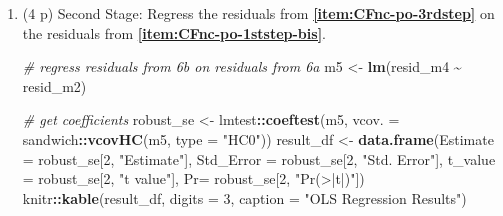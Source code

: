 \documentclass[
]{article}
\newenvironment{Shaded}{\begin{snugshade}}{\end{snugshade}}
\newcommand{\AttributeTok}[1]{\textcolor[rgb]{0.13,0.29,0.53}{#1}}
\newcommand{\CommentTok}[1]{\textcolor[rgb]{0.56,0.35,0.01}{\textit{#1}}}
\newcommand{\DecValTok}[1]{\textcolor[rgb]{0.00,0.00,0.81}{#1}}
\newcommand{\FunctionTok}[1]{\textcolor[rgb]{0.13,0.29,0.53}{\textbf{#1}}}
\newcommand{\NormalTok}[1]{#1}
\newcommand{\OtherTok}[1]{\textcolor[rgb]{0.56,0.35,0.01}{#1}}
\newcommand{\SpecialCharTok}[1]{\textcolor[rgb]{0.81,0.36,0.00}{\textbf{#1}}}
\newcommand{\StringTok}[1]{\textcolor[rgb]{0.31,0.60,0.02}{#1}}
\begin{document}
\begin{enumerate}
\begin{enumerate}
\begin{enumerate}
\begin{Shaded}
\end{Shaded}
    \item
      (4 p) Second Stage: Regress the residuals from
      \textbf{\ref{item:CFnc-po-3rdstep}} on the residuals from
      \textbf{\ref{item:CFnc-po-1ststep-bis}}.\label{item:CFnc-po-4thstep}

\begin{Shaded}
\begin{Highlighting}[]
\CommentTok{\# regress residuals from 6b on residuals from 6a}
\NormalTok{m5 }\OtherTok{\textless{}{-}} \FunctionTok{lm}\NormalTok{(resid\_m4 }\SpecialCharTok{\textasciitilde{}}\NormalTok{ resid\_m2)}

\CommentTok{\# get coefficients}
\NormalTok{robust\_se }\OtherTok{\textless{}{-}}\NormalTok{ lmtest}\SpecialCharTok{::}\FunctionTok{coeftest}\NormalTok{(m5, }\AttributeTok{vcov. =}\NormalTok{ sandwich}\SpecialCharTok{::}\FunctionTok{vcovHC}\NormalTok{(m5, }\AttributeTok{type =} \StringTok{"HC0"}\NormalTok{))}
\NormalTok{result\_df }\OtherTok{\textless{}{-}} \FunctionTok{data.frame}\NormalTok{(}\AttributeTok{Estimate =}\NormalTok{ robust\_se[}\DecValTok{2}\NormalTok{, }\StringTok{"Estimate"}\NormalTok{],}
                        \AttributeTok{Std\_Error =}\NormalTok{ robust\_se[}\DecValTok{2}\NormalTok{, }\StringTok{"Std. Error"}\NormalTok{],}
                        \AttributeTok{t\_value =}\NormalTok{ robust\_se[}\DecValTok{2}\NormalTok{, }\StringTok{"t value"}\NormalTok{],}
                        \AttributeTok{Pr=}\NormalTok{ robust\_se[}\DecValTok{2}\NormalTok{, }\StringTok{"Pr(\textgreater{}|t|)"}\NormalTok{])}
\NormalTok{knitr}\SpecialCharTok{::}\FunctionTok{kable}\NormalTok{(result\_df, }\AttributeTok{digits =} \DecValTok{3}\NormalTok{, }\AttributeTok{caption =} \StringTok{"OLS Regression Results"}\NormalTok{)}
\end{Highlighting}
\end{Shaded}


\end{enumerate}
\end{enumerate}
\end{enumerate}
\end{document}
